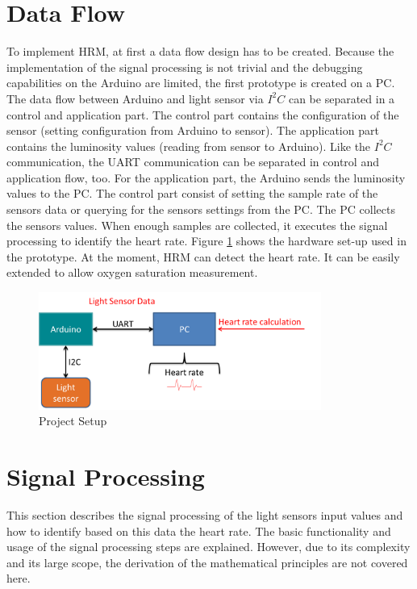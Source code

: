 \documentclass[notitlepage]{scrreprt}
\begin{document}
\section{Data Flow}
To implement HRM, at first a data flow design has to be created. Because the implementation of the signal processing is not trivial and the debugging capabilities on the Arduino are limited, the first prototype is created on a PC. The data flow between Arduino and light sensor via $I^2C$ can be separated in a control and application part. The control part contains the configuration of the sensor (setting configuration from Arduino to sensor). The application part contains the luminosity values (reading from sensor to Arduino). Like the $I^2C$ communication, the UART communication can be separated in control and application flow, too. For the application part, the Arduino sends the luminosity values to the PC. The control part consist of setting the sample rate of the sensors data or querying for the sensors settings from the PC. The PC collects the sensors values. When enough samples are collected, it executes the signal processing to identify the heart rate. Figure \ref{fig:data-flow2} shows the hardware set-up used in the prototype. At the moment, HRM can detect the heart rate. It can be easily extended to allow oxygen saturation measurement.

\begin{figure}[H]
	\centering
	\includegraphics[width=350px]{images/general_dataFlow_second.png}
	\caption{Project Setup}
	\label{fig:data-flow2}
\end{figure}

\section{Signal Processing}
\label{sec:signal-processing}
This section describes the signal processing of the light sensors input values and how to identify based on this data the heart rate. The basic functionality and usage of the signal processing steps are explained. However, due to its complexity and its large scope, the derivation of the mathematical principles are not covered here.
\end{document}
